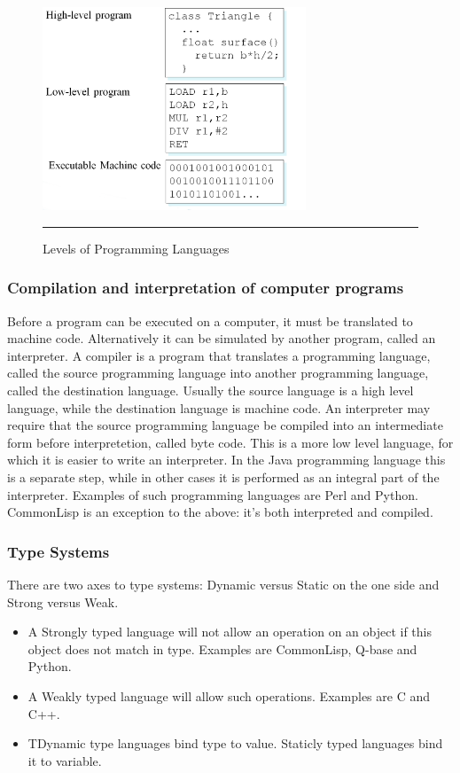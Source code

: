 \begin{figure}[h!]
	\centering
	\includegraphics[width=0.7\textwidth]{./images/lavels.jpg}
	\rule{0.7\textwidth}{1pt}
	\caption{Levels of Programming Languages}
\end{figure}
\subsubsection*{Compilation and interpretation of computer programs}

Before a program can be executed on a computer, it must be translated to machine code. Alternatively it can be simulated by another program, called an interpreter. A compiler is a program that translates a programming language, called the source programming language into another programming language, called the destination language. Usually the source language is a high level language, while the destination language is machine code. An interpreter may require that the source programming language be compiled into an intermediate form before interpretetion, called byte code. This is a more low level language, for which it is easier to write an interpreter. In the Java programming language this is a separate step, while in other cases it is performed as an integral part of the interpreter. Examples of such programming languages are Perl and Python. CommonLisp is an exception to the above: it's both interpreted and compiled.

\subsubsection*{Type Systems}
There are two axes to type systems: Dynamic versus Static on the one side and Strong versus Weak.

\begin{itemize}
	\item A Strongly typed language will not allow an operation on an object if this object does not match in type. Examples are CommonLisp, Q-base and Python.
	\item A Weakly typed language will allow such operations. Examples are C and C++.
	\item TDynamic type languages bind type to value. Staticly typed languages bind it to variable.
\end{itemize}

